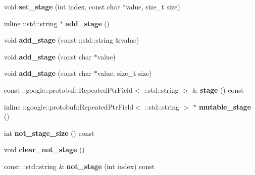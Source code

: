 \begin{DoxyCompactItemize}
void {\bfseries set\+\_\+stage} (int index, const char $\ast$value, size\+\_\+t size)
\item 
\mbox{\label{classcaffe_1_1_net_state_rule_ae6d1764273ef4f23a46da5c75d9c88ed}} 
inline \+::std\+::string $\ast$ {\bfseries add\+\_\+stage} ()
\item 
\mbox{\label{classcaffe_1_1_net_state_rule_aa1c7ffd0d21e01191e810c263c11d284}} 
void {\bfseries add\+\_\+stage} (const \+::std\+::string \&value)
\item 
\mbox{\label{classcaffe_1_1_net_state_rule_a4d11adaa0f0cc56cd4888352c97f9a1d}} 
void {\bfseries add\+\_\+stage} (const char $\ast$value)
\item 
\mbox{\label{classcaffe_1_1_net_state_rule_a0ebb858bad148a6e4040bed5be1773b8}} 
void {\bfseries add\+\_\+stage} (const char $\ast$value, size\+\_\+t size)
\item 
\mbox{\label{classcaffe_1_1_net_state_rule_a672e1024199e3f688b1a3e583b224200}} 
const \+::google\+::protobuf\+::\+Repeated\+Ptr\+Field$<$ \+::std\+::string $>$ \& {\bfseries stage} () const
\item 
\mbox{\label{classcaffe_1_1_net_state_rule_a10fcdf251d67af6b6d13b91d86917b87}} 
inline \+::google\+::protobuf\+::\+Repeated\+Ptr\+Field$<$ \+::std\+::string $>$ $\ast$ {\bfseries mutable\+\_\+stage} ()
\item 
\mbox{\label{classcaffe_1_1_net_state_rule_a667cddaa4c964d14c25f207d49e54b6a}} 
int {\bfseries not\+\_\+stage\+\_\+size} () const
\item 
\mbox{\label{classcaffe_1_1_net_state_rule_a69e70bd95221d61e3088915a8bbf4f50}} 
void {\bfseries clear\+\_\+not\+\_\+stage} ()
\item 
\mbox{\label{classcaffe_1_1_net_state_rule_a60a00663fc845586cde733b91c7b9232}} 
const \+::std\+::string \& {\bfseries not\+\_\+stage} (int index) const
\item 

\end{DoxyCompactItemize}
